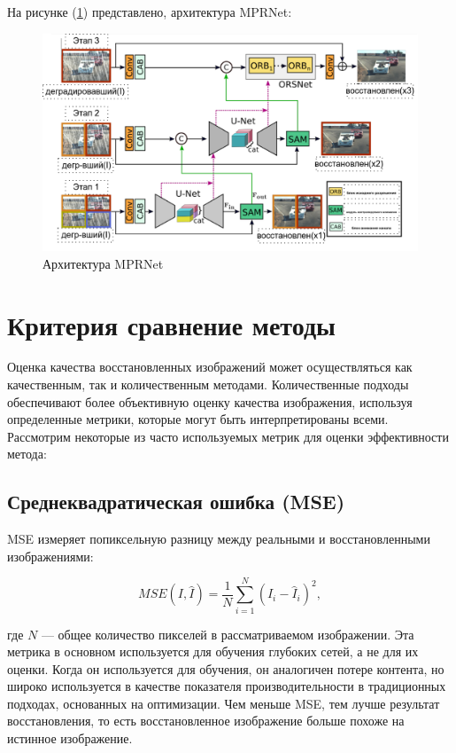 На рисунке (\ref{fig:MPRNet}) представлено, архитектура MPRNet: 
\begin{figure}[H]
	\centering
	\includegraphics[width=1\linewidth]{assets/MPRNet.png}
	\caption{Архитектура MPRNet}
	\label{fig:MPRNet}
\end{figure}

\section{Критерия сравнение методы}

Оценка качества восстановленных изображений может осуществляться как качественным, так и количественным методами. Количественные подходы обеспечивают более объективную оценку качества изображения, используя определенные метрики, которые могут быть интерпретированы всеми. Рассмотрим некоторые из часто используемых метрик для оценки эффективности метода:

\subsection{Среднеквадратическая ошибка (MSE)}

MSE измеряет попиксельную разницу между реальными и восстановленными изображениями:

\begin{equation}\label{eq:mse}
MSE(I, \hat{I}) = \frac{1}{N} \sum_{i=1}^{N} (I_{i} - \hat{I}_{i})^2,
\end{equation}

где \(N\) — общее количество пикселей в рассматриваемом изображении. Эта метрика в основном используется для обучения глубоких сетей, а не для их оценки. Когда он используется для обучения, он аналогичен потере контента, но широко используется в качестве показателя производительности в традиционных подходах, основанных на оптимизации. Чем меньше MSE, тем лучше результат восстановления, то есть восстановленное изображение больше похоже на истинное изображение.

